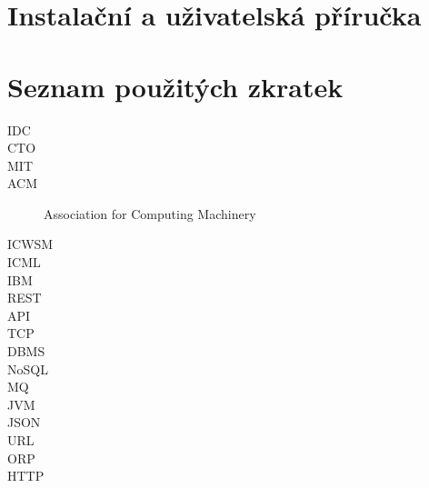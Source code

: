 \documentclass[thesis=M,czech]{FITthesis}[2014/05/07]
\begin{document}
\chapter{Instalační a uživatelská příručka}

\chapter{Seznam použitých zkratek}
\begin{description}
	\item[IDC] 
	\item[CTO]
	\item[MIT]	
	\item[ACM] Association for Computing Machinery	
	\item[ICWSM]	
	\item[ICML]	
	\item[IBM]	
	\item[REST]	
	\item[API]							
	\item[TCP]
	\item[DBMS]
	\item[NoSQL]
	\item[MQ]
	\item[JVM]
	\item[JSON]
	\item[URL]
	\item[ORP]
	\item[HTTP]
\end{description}
\end{document}
